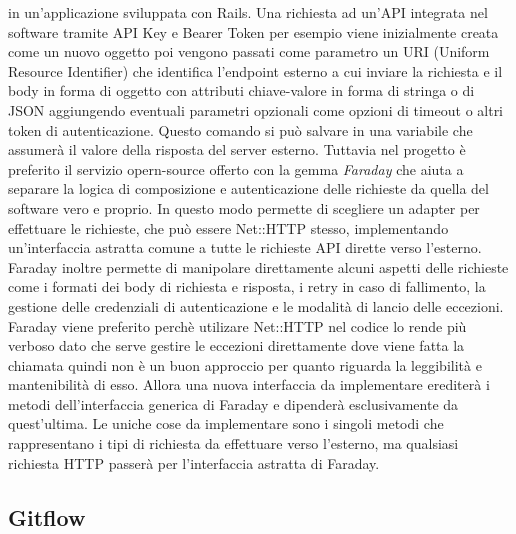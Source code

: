 \documentclass[target=bach,aauheader=,style=]{thud}
\begin{document}
in un'applicazione sviluppata con Rails. Una richiesta ad un'API integrata nel software tramite API Key e Bearer Token per esempio viene inizialmente creata come un nuovo oggetto poi
vengono passati come parametro un URI (Uniform Resource Identifier) che identifica l'endpoint esterno a cui inviare la richiesta e il body in forma di oggetto con attributi chiave-valore
in forma di stringa o di JSON aggiungendo eventuali parametri opzionali come opzioni di timeout o altri token di autenticazione. Questo comando si può salvare in una variabile che
assumerà il valore della risposta del server esterno. Tuttavia nel progetto è preferito il servizio opern-source offerto con la gemma \textit{Faraday}\cite{faraday_gem} che aiuta a separare
la logica di composizione e autenticazione delle richieste da quella del software vero e proprio. In questo modo permette di scegliere un adapter per effettuare le richieste, che può essere
Net::HTTP stesso, implementando un'interfaccia astratta comune a tutte le richieste API dirette verso l'esterno. Faraday inoltre permette di manipolare direttamente alcuni aspetti delle richieste
come i formati dei body di richiesta e risposta, i retry in caso di fallimento, la gestione delle credenziali di autenticazione e le modalità di lancio delle eccezioni. Faraday viene
preferito perchè utilizare Net::HTTP nel codice lo rende più verboso dato che serve gestire le eccezioni direttamente dove viene fatta la chiamata quindi non è un buon approccio per
quanto riguarda la leggibilità e mantenibilità di esso. Allora una nuova interfaccia da implementare erediterà i metodi dell'interfaccia generica di Faraday e dipenderà esclusivamente da
quest'ultima. Le uniche cose da implementare sono i singoli metodi che rappresentano i tipi di richiesta da effettuare verso l'esterno, ma qualsiasi richiesta HTTP passerà per l'interfaccia
astratta di Faraday.

\subsection{Gitflow}
\end{document}
